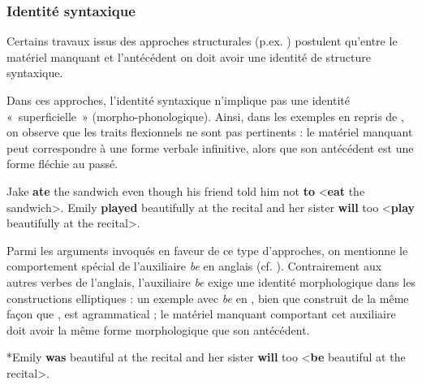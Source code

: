 \subsubsection{Identité syntaxique}

Certains travaux issus des approches structurales (p.ex. \citealt{Sag1976,Williams1977,FiengoEtAl1994,ChungEtAl1995}) postulent qu’entre le matériel manquant et l’antécédent on doit avoir une identité de structure syntaxique. 

Dans ces approches, l’identité syntaxique n’implique pas une identité «~superficielle~» (morpho-phonologique). Ainsi, dans les exemples en  repris de \citet{Merchant2009}, on observe que les traits flexionnels ne sont pas pertinents : le matériel manquant peut correspondre à une forme verbale infinitive, alors que son antécédent est une forme fléchie au passé.

\ea \label{ch1:ex150}
\ea  Jake \textbf{ate} the sandwich even though his friend told him not \textbf{to} {\textless}\textbf{eat} the sandwich{\textgreater}. 
\ex  Emily \textbf{played} beautifully at the recital and her sister \textbf{will} too {\textless}\textbf{play} beautifully at the recital{\textgreater}.  
\z
\z

Parmi les arguments invoqués en faveur de ce type d'approches, on mentionne le comportement spécial de l’auxiliaire \textit{be} en anglais (cf. \citealt{Merchant2009}). Contrairement aux autres verbes de l’anglais, l’auxiliaire \textit{be} exige une identité morphologique dans les constructions elliptiques : un exemple avec \textit{be} en , bien que construit de la même façon que , est agrammatical ; le matériel manquant comportant cet auxiliaire doit avoir la même forme morphologique que son antécédent.

\ea \label{ch1:ex151}
*Emily \textbf{was} beautiful at the recital and her sister \textbf{will} too {\textless}\textbf{be} beautiful at the recital{\textgreater}.   
\z

